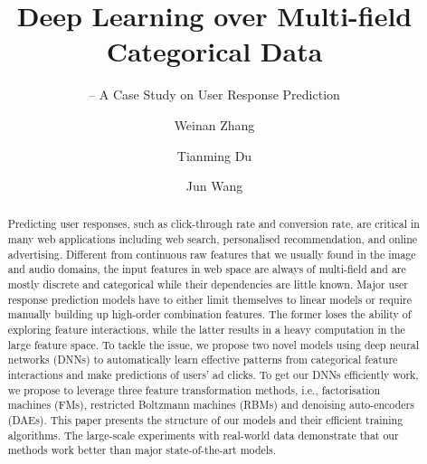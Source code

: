 \documentclass{llncs}
\begin{document}
\title{Deep Learning over Multi-field Categorical Data}
\subtitle{-- A Case Study on User Response Prediction}

\author{Weinan Zhang \and Tianming Du \and Jun Wang}

\maketitle

\vspace{-10pt}
\begin{abstract}
Predicting user responses, such as click-through rate and conversion rate, are critical in many web applications including web search, personalised recommendation, and online advertising. Different from continuous raw features that we usually found in the image and audio domains, the input features in web space are always of multi-field and are mostly discrete and categorical while their dependencies are little known. Major user response prediction models have to either limit themselves to linear models or require manually building up high-order combination features. The former loses the ability of exploring feature interactions, while the latter results in a heavy computation in the large feature space. To tackle the issue, we propose two novel models using deep neural networks (DNNs) to automatically learn effective patterns from categorical feature interactions and make predictions of users' ad clicks. To get our DNNs efficiently work, we propose to leverage three feature transformation methods, i.e., factorisation machines (FMs), restricted Boltzmann machines (RBMs) and denoising auto-encoders (DAEs). This paper presents the structure of our models and their efficient training algorithms. The large-scale experiments with real-world data demonstrate that our methods work better than major state-of-the-art models.
\end{abstract}
\end{document}
